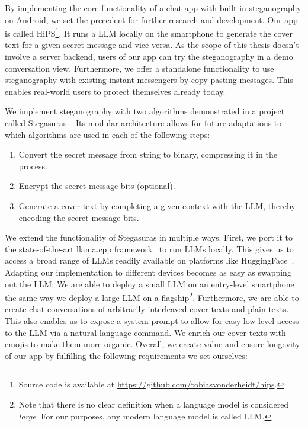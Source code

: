 By implementing the core functionality of a chat app with built-in steganography on Android, we set the precedent for further research and development. Our app is called \gls{HiPS}\footnote{Source code is available at \url{https://github.com/tobiasvonderheidt/hips}.}. It runs a \gls{LLM} locally on the smartphone to generate the cover text for a given secret message and vice versa. As the scope of this thesis doesn't involve a server backend, users of our app can try the steganography in a demo conversation view. Furthermore, we offer a standalone functionality to use steganography with existing instant messengers by copy-pasting messages. This enables real-world users to protect themselves already today.

We implement steganography with two algorithms demonstrated in a project called Stegasuras~\cite{zieglerNeuralLinguisticSteganography2019}. Its modular architecture allows for future adaptations to which algorithms are used in each of the following steps:

\begin{enumerate}
    \item Convert the secret message from string to binary, compressing it in the process.
    \item Encrypt the secret message bits (optional).
    \item Generate a cover text by completing a given context with the \gls{LLM}, thereby encoding the secret message bits.
\end{enumerate}

We extend the functionality of Stegasuras in multiple ways. First, we port it to the state-of-the-art llama.cpp framework~\cite{gerganovGgerganovLlamacpp2024} to run \glspl{LLM} locally. This gives us to access a broad range of \glspl{LLM} readily available on platforms like HuggingFace~\cite{huggingfaceModelsHuggingFace2025}. Adapting our implementation to different devices becomes as easy as swapping out the \gls{LLM}: We are able to deploy a small \gls{LLM} on an entry-level smartphone the same way we deploy a large \gls{LLM} on a flagship\footnote{Note that there is no clear definition when a language model is considered \textit{large}. For our purposes, any modern language model is called \gls{LLM}.}. Furthermore, we are able to create chat conversations of arbitrarily interleaved cover texts and plain texts. This also enables us to expose a system prompt to allow for easy low-level access to the \gls{LLM} via a natural language command. We enrich our cover texts with emojis to make them more organic. Overall, we create value and ensure longevity of our app by fulfilling the following requirements we set ourselves:

